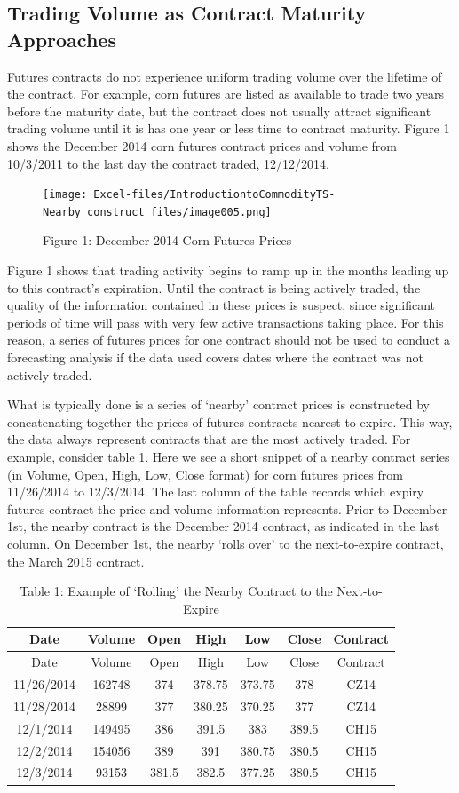\documentclass[
]{book}
\begin{document}
\hypertarget{trading-volume-as-contract-maturity-approaches}{%
\subsection{Trading Volume as Contract Maturity Approaches}\label{trading-volume-as-contract-maturity-approaches}}

Futures contracts do not experience uniform trading volume over the lifetime of the contract. For example, corn futures are listed as available to trade two years before the maturity date, but the contract does not usually attract significant trading volume until it is has one year or less time to contract maturity. Figure 1 shows the December 2014 corn futures contract prices and volume from 10/3/2011 to the last day the contract traded, 12/12/2014.

\begin{figure}
\centering
\texttt{[image: Excel-files/IntroductiontoCommodityTS-Nearby\_construct\_files/image005.png]}
\caption{Figure 1: December 2014 Corn Futures Prices}
\end{figure}

Figure 1 shows that trading activity begins to ramp up in the months leading up to this contract's expiration. Until the contract is being actively traded, the quality of the information contained in these prices is suspect, since significant periods of time will pass with very few active transactions taking place. For this reason, a series of futures prices for one contract should not be used to conduct a forecasting analysis if the data used covers dates where the contract was not actively traded.

What is typically done is a series of `nearby' contract prices is constructed by concatenating together the prices of futures contracts nearest to expire. This way, the data always represent contracts that are the most actively traded. For example, consider table 1. Here we see a short snippet of a nearby contract series (in Volume, Open, High, Low, Close format) for corn futures prices from 11/26/2014 to 12/3/2014. The last column of the table records which expiry futures contract the price and volume information represents. Prior to December 1st, the nearby contract is the December 2014 contract, as indicated in the last column. On December 1st, the nearby `rolls over' to the next-to-expire contract, the March 2015 contract.

\begin{longtable}[]{@{}ccccccc@{}}
\caption{Table 1: Example of `Rolling' the Nearby Contract to the Next-to-Expire}\tabularnewline
\toprule
Date & Volume & Open & High & Low & Close & Contract\tabularnewline
\midrule
\endfirsthead
\toprule
Date & Volume & Open & High & Low & Close & Contract\tabularnewline
\midrule
\endhead
11/26/2014 & 162748 & 374 & 378.75 & 373.75 & 378 & CZ14\tabularnewline
11/28/2014 & 28899 & 377 & 380.25 & 370.25 & 377 & CZ14\tabularnewline
12/1/2014 & 149495 & 386 & 391.5 & 383 & 389.5 & CH15\tabularnewline
12/2/2014 & 154056 & 389 & 391 & 380.75 & 380.5 & CH15\tabularnewline
12/3/2014 & 93153 & 381.5 & 382.5 & 377.25 & 380.5 & CH15\tabularnewline
\bottomrule
\end{longtable}
\end{document}

